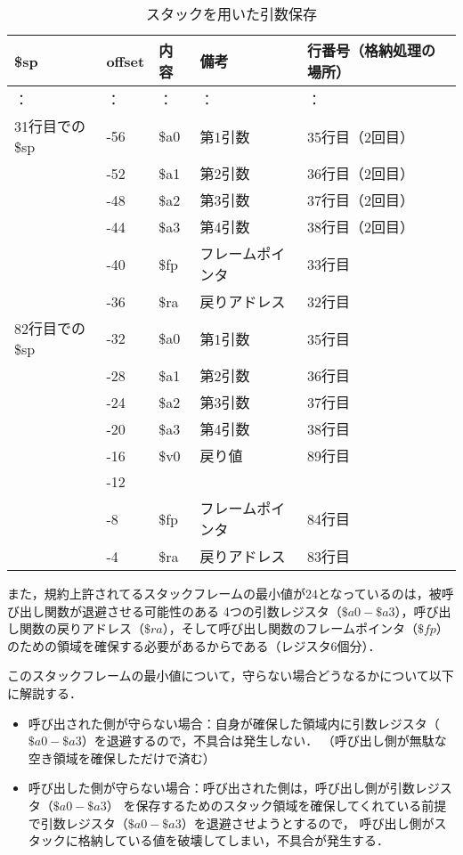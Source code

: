 \documentclass[a4j,11pt]{jarticle}
\begin{document}
\begin{table}[t]
      \centering
      \caption{スタックを用いた引数保存}
      \label{tbl:2-2}
      \begin{tabular}{|l|l|l|l|l|}
      \hline
      \$sp       & offset & 内容   & 備考       & 行番号（格納処理の場所） \\ \hline
：          & ：      & ：    & ：        & ：            \\ \hline
31行目での\$sp & -56    & \$a0 & 第1引数     & 35行目（2回目）    \\ \hline
           & -52    & \$a1 & 第2引数     & 36行目（2回目）    \\ \hline
           & -48    & \$a2 & 第3引数     & 37行目（2回目）    \\ \hline
           & -44    & \$a3 & 第4引数     & 38行目（2回目）    \\ \hline
           & -40    & \$fp & フレームポインタ & 33行目         \\ \hline
           & -36    & \$ra & 戻りアドレス   & 32行目         \\ \hline
82行目での\$sp & -32    & \$a0 & 第1引数     & 35行目         \\ \hline
           & -28    & \$a1 & 第2引数     & 36行目         \\ \hline
           & -24    & \$a2 & 第3引数     & 37行目         \\ \hline
           & -20    & \$a3 & 第4引数     & 38行目         \\ \hline
           & -16    & \$v0 & 戻り値      & 89行目         \\ \hline
           & -12    &      &          &              \\ \hline
           & -8     & \$fp & フレームポインタ & 84行目         \\ \hline
           & -4     & \$ra & 戻りアドレス   & 83行目         \\ \hline
      \end{tabular}
      \end{table}




また，規約上許されてるスタックフレームの最小値が$24$となっているのは，被呼び出し関数が退避させる可能性のある
4つの引数レジスタ（$\$a0-\$a3$），呼び出し関数の戻りアドレス（$\$ra$），そして呼び出し関数のフレームポインタ（$\$fp$）
のための領域を確保する必要があるからである（レジスタ6個分）．

このスタックフレームの最小値について，守らない場合どうなるかについて以下に解説する．
\begin{itemize}
      \item 呼び出された側が守らない場合：自身が確保した領域内に引数レジスタ（$\$a0-\$a3$）を退避するので，不具合は発生しない．
      （呼び出し側が無駄な空き領域を確保しただけで済む）
      \item 呼び出した側が守らない場合：呼び出された側は，呼び出し側が引数レジスタ（$\$a0-\$a3$）
      を保存するためのスタック領域を確保してくれている前提で引数レジスタ（$\$a0-\$a3$）を退避させようとするので，
      呼び出し側がスタックに格納している値を破壊してしまい，不具合が発生する．
\end{itemize}
\end{document}
